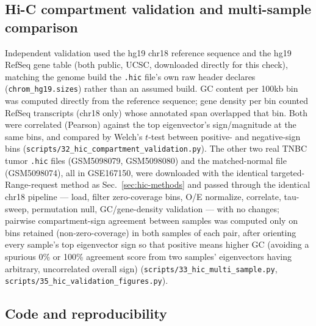 \documentclass[11pt]{article}
\begin{document}
\subsection{Hi-C compartment validation and multi-sample comparison}
\label{sec:hic-validation-methods}

Independent validation used the hg19 chr18 reference sequence and the
hg19 RefSeq gene table (both public, UCSC, downloaded directly for
this check), matching the genome build the \texttt{.hic} file's own
raw header declares (\texttt{chrom\_hg19.sizes}) rather than an assumed
build. GC content per 100kb bin was computed directly from the reference
sequence; gene density per bin counted RefSeq transcripts (chr18 only)
whose annotated span overlapped that bin. Both were correlated (Pearson)
against the top eigenvector's sign/magnitude at the same bins, and
compared by Welch's $t$-test between positive- and negative-sign bins
(\texttt{scripts/32\_hic\_compartment\_validation.py}). The other two
real TNBC tumor \texttt{.hic} files (GSM5098079, GSM5098080) and the
matched-normal file (GSM5098074), all in GSE167150, were downloaded
with the identical targeted-Range-request method as
Sec.~\ref{sec:hic-methods} and passed through the identical chr18
pipeline --- load, filter zero-coverage bins, O/E normalize, correlate,
tau-sweep, permutation null, GC/gene-density validation --- with no
changes; pairwise compartment-sign agreement between samples was
computed only on bins retained (non-zero-coverage) in both samples of
each pair, after orienting every sample's top eigenvector sign so that
positive means higher GC (avoiding a spurious 0\% or 100\% agreement
score from two samples' eigenvectors having arbitrary, uncorrelated
overall sign) (\texttt{scripts/33\_hic\_multi\_sample.py},
\texttt{scripts/35\_hic\_validation\_figures.py}).

\subsection{Code and reproducibility}
\end{document}
